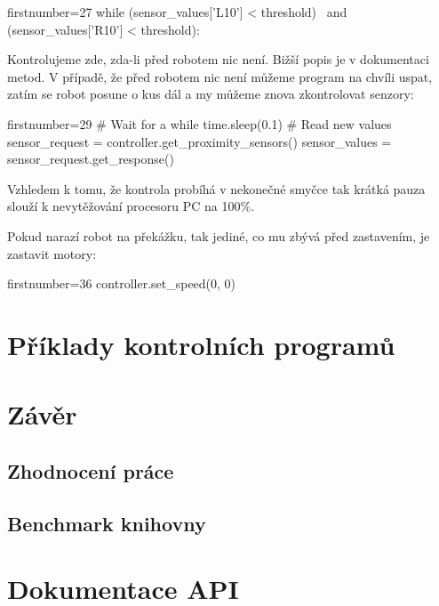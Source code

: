 \documentclass[12pt,notitlepage]{report}
\begin{document}
    \begin{pyc*}{firstnumber=27}
while (sensor_values['L10'] < threshold) \
       and (sensor_values['R10'] < threshold):
    \end{pyc*}

    Kontrolujeme zde, zda-li  před robotem nic není. Bižší popis je v
    dokumentaci metod. V případě, že před robotem nic není můžeme program na
    chvíli uspat, zatím se robot posune o kus dál a my můžeme znova
    zkontrolovat senzory:

    \begin{pyc*}{firstnumber=29}
    # Wait for a while
    time.sleep(0.1)
    # Read new values
    sensor_request = controller.get_proximity_sensors()
    sensor_values = sensor_request.get_response()
    \end{pyc*}

    Vzhledem k tomu, že kontrola probíhá v nekonečné smyčce tak krátká pauza
    slouží k nevytěžování procesoru PC na 100\%.

    Pokud narazí robot na překážku, tak jediné, co mu zbývá před zastavením, je
    zastavit motory:

    \begin{pyc*}{firstnumber=36}
    controller.set_speed(0, 0)
    \end{pyc*}

\chapter{Příklady kontrolních programů} %

\chapter{Závěr} %

    \section{Zhodnocení práce}

    \section{Benchmark knihovny}

\appendix

\chapter{Dokumentace API}%
\end{document}

